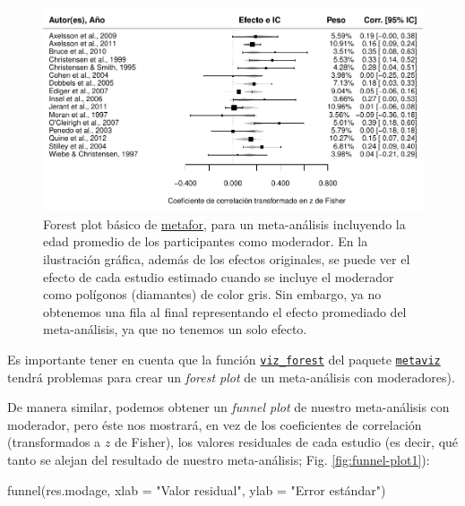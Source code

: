 \documentclass[
  bookmarksnumbered]{article}
\newenvironment{Shaded}{\begin{snugshade}}{\end{snugshade}}
\newcommand{\AttributeTok}[1]{\textcolor[rgb]{0.00,0.34,0.68}{#1}}
\newcommand{\FunctionTok}[1]{\textcolor[rgb]{0.39,0.29,0.61}{#1}}
\newcommand{\NormalTok}[1]{\textcolor[rgb]{0.12,0.11,0.11}{#1}}
\newcommand{\StringTok}[1]{\textcolor[rgb]{0.75,0.01,0.01}{#1}}
\begin{document}
\begin{figure}
\centering
\includegraphics{Meta-analysis_files/figure-latex/for-plot-mod1-1.pdf}
\caption{\label{fig:for-plot-mod1}Forest plot básico de \href{https://www.metafor-project.org/doku.php}{metafor}, para un meta-análisis incluyendo la edad promedio de los participantes como moderador. En la ilustración gráfica, además de los efectos originales, se puede ver el efecto de cada estudio estimado cuando se incluye el moderador como polígonos (diamantes) de color gris. Sin embargo, ya no obtenemos una fila al final representando el efecto promediado del meta-análisis, ya que no tenemos un solo efecto.}
\end{figure}

Es importante tener en cuenta que la función \href{https://cran.r-project.org/web/packages/metaviz/vignettes/metaviz.html\#creating-forest-plots-with-function-viz_forest}{\texttt{viz\_forest}} del paquete \href{https://cran.r-project.org/web/packages/metaviz/vignettes/metaviz.html}{\texttt{metaviz}} tendrá problemas para crear un \emph{forest plot} de un meta-análisis con moderadores).

De manera similar, podemos obtener un \emph{funnel plot} de nuestro meta-análisis con moderador, pero éste nos mostrará, en vez de los coeficientes de correlación (transformados a \(z\) de Fisher), los valores residuales de cada estudio (es decir, qué tanto se alejan del resultado de nuestro meta-análisis; Fig. \ref{fig:funnel-plot1}):

\begin{Shaded}
\begin{Highlighting}[]
\FunctionTok{funnel}\NormalTok{(res.modage,}
       \AttributeTok{xlab =} \StringTok{"Valor residual"}\NormalTok{,}
       \AttributeTok{ylab =} \StringTok{"Error estándar"}\NormalTok{)}
\end{Highlighting}
\end{Shaded}
\end{document}
